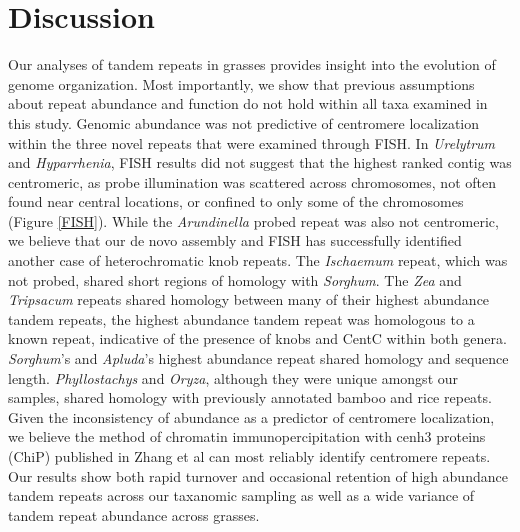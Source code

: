 \documentclass[10pt,letterpaper]{article}
\begin{document}
\section*{Discussion}

Our analyses of tandem repeats in grasses provides insight into the evolution of genome organization.
Most importantly, we show that previous assumptions about repeat abundance and function do not hold within all taxa examined in this study.
Genomic abundance was not predictive of centromere localization within the three novel repeats that were examined through FISH.
In \emph{Urelytrum} and \emph{Hyparrhenia}, FISH results did not suggest that the highest ranked contig was centromeric, as probe illumination was scattered across chromosomes, not often found near central locations, or confined to only some of the chromosomes (Figure \ref{FISH}).
While the \emph{Arundinella} probed repeat was also not centromeric, we believe that our de novo assembly and FISH has successfully identified another case of heterochromatic knob repeats.
The \emph{Ischaemum} repeat, which was not probed, shared short regions of homology with \emph{Sorghum}.
The \emph{Zea} and \emph{Tripsacum} repeats shared homology between many of their highest abundance tandem repeats, the highest abundance tandem repeat was homologous to a known repeat, indicative of the presence of knobs and CentC within both genera.
\emph{Sorghum}'s and \emph{Apluda}'s highest abundance repeat shared homology and sequence length. 
\emph{Phyllostachys} and \emph{Oryza}, although they were unique amongst our samples, shared homology with previously annotated bamboo and rice repeats.
Given the inconsistency of abundance as a predictor of centromere localization, we believe the method of chromatin immunopercipitation with cenh3 proteins (ChiP) published in Zhang et al \cite{zhang2014boom} can most reliably identify centromere repeats.
Our results show both rapid turnover and occasional retention of high abundance tandem repeats across our taxanomic sampling as well as a wide variance of tandem repeat abundance across grasses.

\end{document}
